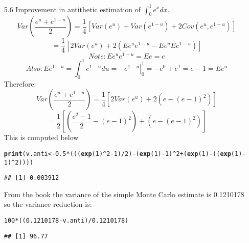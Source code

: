 \documentclass{article}\usepackage[]{graphicx}\usepackage[]{color}
\makeatletter
\newcommand{\hlkwd}[1]{\textcolor[rgb]{0.737,0.353,0.396}{\textbf{#1}}}%
\newenvironment{kframe}{%
 \def\at@end@of@kframe{}%
 \ifinner\ifhmode%
  \def\at@end@of@kframe{\end{minipage}}%
  \begin{minipage}{\columnwidth}%
 \fi\fi%
 \def\FrameCommand##1{\hskip\@totalleftmargin \hskip-\fboxsep
 \colorbox{shadecolor}{##1}\hskip-\fboxsep
     \hskip-\linewidth \hskip-\@totalleftmargin \hskip\columnwidth}%
 \MakeFramed {\advance\hsize-\width
   \@totalleftmargin\z@ \linewidth\hsize
   \@setminipage}}%
 {\par\unskip\endMakeFramed%
 \at@end@of@kframe}
\newenvironment{knitrout}{}{} %
\makeatother
\begin{document}
\begin{itemize}
\item[5.6]  Improvement in antithetic estimation of $\int_0^1e^xdx$.\\
$$Var\left(\frac{e^u+e^{1-u}}{2}\right)=\frac{1}{4}\left[Var(e^u)+Var(e^{1-u})+2Cov(e^u,e^{1-u})\right]$$
$$=\frac{1}{4}\left[2Var(e^u)+2\left(Ee^ue^{1-u}-Ee^uEe^{1-u}\right)\right]$$
$$Note:Ee^ue^{1-u}=Ee=e$$
$$Also:Ee^{1-u}=\int_0^1e^{1-u}du=\left. -e^{1-u}\right|_0^1 = -e^0+e^1 = e-1 = Ee^u$$
Therefore:
$$Var\left(\frac{e^u+e^{1-u}}{2}\right) =\frac{1}{4}\left[2Var(e^u)+2\left(e-(e-1)^2\right)\right]$$
$$ = \frac{1}{2} \left[ \left(\frac{e^2-1}{2}-(e-1)^2\right)+\left(e-(e-1)^2\right)\right]$$
This is computed below
\begin{knitrout}
\color{fgcolor}\begin{kframe}
\begin{alltt}
\hlkwd{print}(v.anti <- 0.5 * (((\hlkwd{exp}(1)^2 - 1)/2) - (\hlkwd{exp}(1) - 1)^2 + (\hlkwd{exp}(1) - ((\hlkwd{exp}(1) - 
    1)^2))))
\end{alltt}
\begin{verbatim}
## [1] 0.003912
\end{verbatim}
\end{kframe}
\end{knitrout}

From the book the variance of the simple Monte Carlo estimate is 0.1210178 so the variance reduction is:
\begin{knitrout}
\color{fgcolor}\begin{kframe}
\begin{alltt}
100 * ((0.1210178 - v.anti)/0.1210178)
\end{alltt}
\begin{verbatim}
## [1] 96.77
\end{verbatim}
\end{kframe}
\end{knitrout}



\end{itemize}
\end{document}
